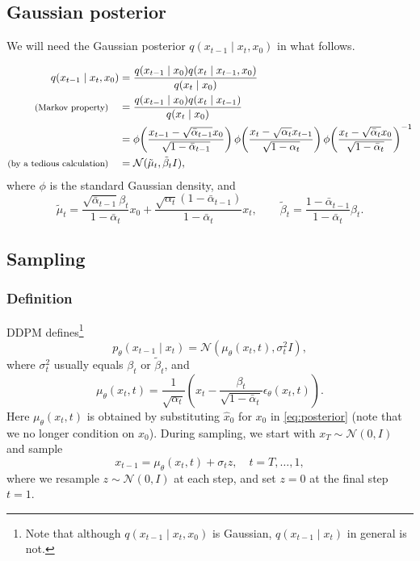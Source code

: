 \documentclass[11pt,a4paper]{article}
\theoremstyle{plain} %
\theoremstyle{definition}
\theoremstyle{remark}
\newcommand{\bra}[1]{\mathopen{}\left(#1\right)}
\newcommand{\N}{\mathbb{N}}
\renewcommand{\N}{\mathcal{N}}
\newcommand{\eps}{\epsilon_\theta(x_t,t)}
\newcommand{\pmean}{\mu_\theta(x_t,t)}
\begin{document}
\subsection{Gaussian posterior}

We will need the Gaussian posterior $q(x_{t-1}\mid x_t,x_0)$ in what follows.

\begin{align*}
    q(x_{t-1}\mid x_t,x_0) &= \frac{q(x_{t-1}\mid x_0)q(x_t\mid x_{t-1},x_0)}{q(x_t\mid x_0)} \\
    \text{\footnotesize(Markov property)}\quad &= \frac{q(x_{t-1}\mid x_0)q(x_t\mid x_{t-1})}{q(x_t\mid x_0)} \\
    &= \phi\bra{\frac{x_{t-1}-\sqrt{\bar\alpha_{t-1}}x_0}{\sqrt{1-\bar\alpha_{t-1}}}} \phi\bra{\frac{x_t-\sqrt{\alpha_t}x_{t-1}}{\sqrt{1-\alpha_t}}} \phi\bra{\frac{x_t-\sqrt{\bar\alpha_t}x_0}{\sqrt{1-\bar\alpha_t}}}^{-1} \\
    \text{\footnotesize(by a tedious calculation)}\quad &= \N(\tilde\mu_t,\tilde\beta_tI),
\end{align*}
where $\phi$ is the standard Gaussian density, and
\begin{equation}\label{eq:posterior}
    \tilde\mu_t=\frac{\sqrt{\bar\alpha_{t-1}}\beta_t}{1-\bar\alpha_t}x_0+\frac{\sqrt{\alpha_t}(1-\bar\alpha_{t-1})}{1-\bar\alpha_t}x_t,\qquad\tilde\beta_t=\frac{1-\bar\alpha_{t-1}}{1-\bar\alpha_t}\beta_t.
\end{equation}

\subsection{Sampling}

\subsubsection{Definition}

DDPM defines\footnote{Note that although $q(x_{t-1}\mid x_t,x_0)$ is Gaussian, $q(x_{t-1}\mid x_t)$ in general is not.}
\[p_\theta(x_{t-1}\mid x_t) = \N(\pmean,\sigma_t^2I),\]
where $\sigma_t^2$ usually equals $\beta_t$ or $\tilde\beta_t$, and
\begin{equation}\label{eq:post_mean}
    \pmean=\frac1{\sqrt{\alpha_t}}\bra{x_t-\frac{\beta_t}{\sqrt{1-\bar\alpha_t}}\eps}.
\end{equation}
Here $\pmean$ is obtained by substituting $\hat x_0$ for $x_0$ in \eqref{eq:posterior} (note that we no longer condition on $x_0$). During sampling, we start with $x_T\sim\N(0,I)$ and sample
\begin{equation}\label{eq:sample}
    x_{t-1} = \pmean + \sigma_tz,\quad t=T,\dots,1,
\end{equation}
where we resample $z\sim\N(0,I)$ at each step, and set $z=0$ at the final step $t=1$.
\end{document}
